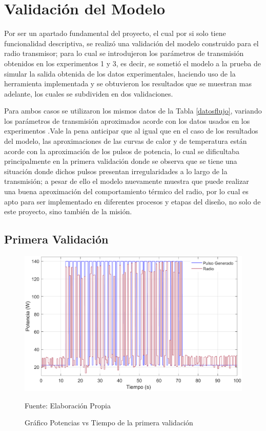 \section{Validación del Modelo }

Por ser un apartado fundamental del proyecto, el cual por si solo tiene funcionalidad descriptiva, se realizó una validación del modelo construido para el radio transmisor; para lo cual se introdujeron los parámetros de transmisión obtenidos en los experimentos 1 y 3, es decir, se sometió el modelo a la prueba de simular la salida obtenida de los datos experimentales, haciendo uso de la herramienta implementada y se obtuvieron los resultados que se muestran mas adelante, los cuales se subdividen en dos validaciones.

Para ambos casos se utilizaron los mismos datos de la Tabla \ref{datosflujo}, variando los parámetros de transmisión aproximados acorde con los datos usados en los experimentos .Vale la pena anticipar que al igual que en el caso de los resultados del modelo, las aproximaciones de las curvas de calor y de temperatura están acorde con la aproximación de los pulsos de potencia, lo cual se dificultaba principalmente en la primera validación donde se observa que se tiene una situación donde dichos pulsos presentan irregularidades a lo largo de la transmisión; a pesar de ello el modelo nuevamente muestra que puede realizar una buena aproximación del comportamiento térmico del radio, por lo cual es apto para ser implementado en diferentes procesos y etapas del diseño, no solo de este proyecto, sino también de la misión.

\subsection{Primera Validación}

\begin{figure}[H]
\centering
\includegraphics[scale=0.67]{Figuras/Validacion_1_P.eps}
\caption{Gráfico Potencias vs Tiempo de la primera validación}
Fuente: Elaboración Propia
\label{validacion_1_P}
\end{figure}

